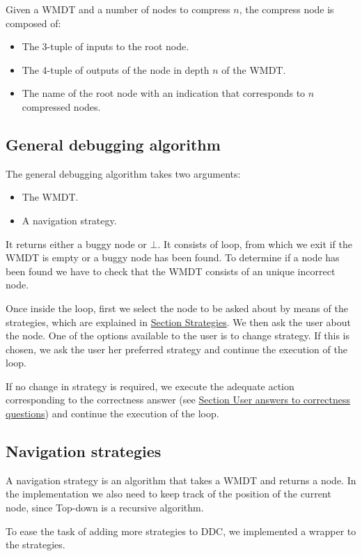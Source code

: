 Given a WMDT and a number of nodes to compress \(n\), the compress node is composed of:
\begin{itemize}
    \item The 3-tuple of inputs to the root node.
    \item The 4-tuple of outputs of the node in depth \(n\) of the WMDT.
    \item The name of the root node with an indication that corresponds to \(n\) compressed nodes.
\end{itemize}

\subsection{General debugging algorithm}
The general debugging algorithm takes two arguments:
\begin{itemize}
    \item The WMDT.
    \item A navigation strategy.
\end{itemize}
It returns either a buggy node or \(\bot\).
It consists of loop, from which we exit if the WMDT is empty or a buggy node has been found.
To determine if a node has been found we have to check that the WMDT consists of an unique incorrect node.

Once inside the loop, first we select the node to be asked about by means of the strategies, which are explained in \hyperref[implementation:Strategies]{Section Strategies}.
We then ask the user about the node. One of the options available to the user is to change strategy. If this is chosen, we ask the user her preferred strategy and continue the execution of the loop.

If no change in strategy is required, we execute the adequate action corresponding to the correctness answer (see \hyperref[implementation:correctnessAnswers]{Section User answers to correctness questions}) and continue the execution of the loop.

\subsection{Navigation strategies}
\label{implementation:Strategies}
A navigation strategy is an algorithm that takes a WMDT and returns a node.
In the implementation we also need to keep track of the position of the current node, since Top-down is a recursive algorithm.

To ease the task of adding more strategies to DDC, we implemented a wrapper to the strategies.

